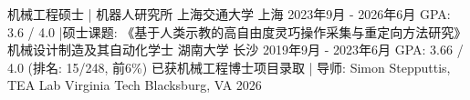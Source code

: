 
\begin{cventries}
	\cventry
	{机械工程硕士 | 机器人研究所} %
	{上海交通大学} %
	{上海} %
	{2023年9月 - 2026年6月} %
	{
        GPA: 3.6 / 4.0 \quad|\quad 硕士课题: 《基于人类示教的高自由度灵巧操作采集与重定向方法研究》
	}%
	\cventry
	{机械设计制造及其自动化学士} %
	{湖南大学} %
	{长沙} %
	{2019年9月 - 2023年6月} %
	{
        GPA: 3.66 / 4.0 (排名: 15/248, 前6\%)
	}%
	\cventry
	{已获机械工程博士项目录取 | 导师: Simon Stepputtis, TEA Lab} %
	{Virginia Tech} %
	{Blacksburg, VA} %
	{2026} %
	{}%
\end{cventries}
